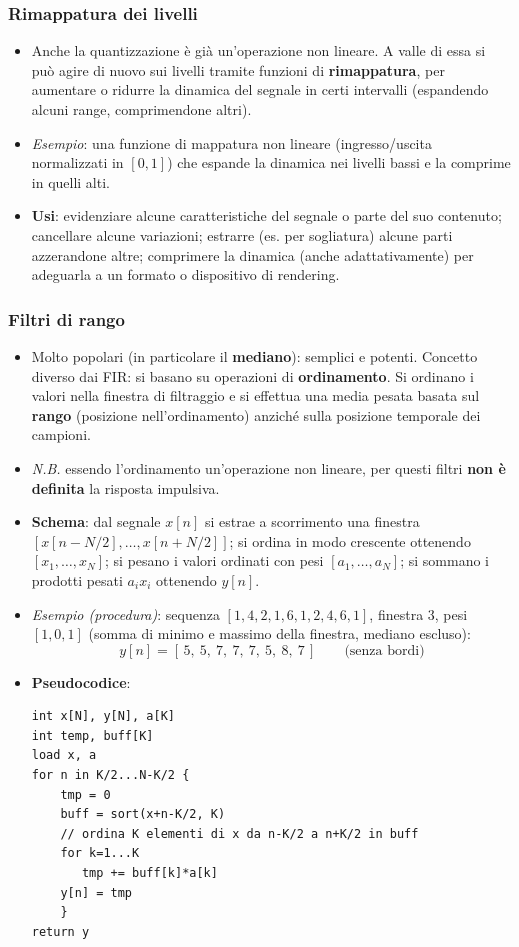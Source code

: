 \documentclass[12pt, a4paper]{article}
\begin{document}
\subsubsection{Rimappatura dei livelli}
\begin{itemize}
    \item Anche la quantizzazione è già un'operazione non lineare. A valle di essa si può agire di nuovo sui livelli tramite funzioni di \textbf{rimappatura}, per aumentare o ridurre la dinamica del segnale in certi intervalli (espandendo alcuni range, comprimendone altri).
    \item \textit{Esempio}: una funzione di mappatura non lineare (ingresso/uscita normalizzati in $[0,1]$) che espande la dinamica nei livelli bassi e la comprime in quelli alti.
    \item \textbf{Usi}: evidenziare alcune caratteristiche del segnale o parte del suo contenuto; cancellare alcune variazioni; estrarre (es. per sogliatura) alcune parti azzerandone altre; comprimere la dinamica (anche adattativamente) per adeguarla a un formato o dispositivo di rendering.
\end{itemize}

\subsubsection{Filtri di rango}
\begin{itemize}
    \item Molto popolari (in particolare il \textbf{mediano}): semplici e potenti. Concetto diverso dai FIR: si basano su operazioni di \textbf{ordinamento}. Si ordinano i valori nella finestra di filtraggio e si effettua una media pesata basata sul \textbf{rango} (posizione nell'ordinamento) anziché sulla posizione temporale dei campioni.
    \item[] \textit{N.B.} essendo l'ordinamento un'operazione non lineare, per questi filtri \textbf{non è definita} la risposta impulsiva.
    \item \textbf{Schema}: dal segnale $x[n]$ si estrae a scorrimento una finestra $[x[n-N/2],\dots,x[n+N/2]]$; si ordina in modo crescente ottenendo $[x_1,\dots,x_N]$; si pesano i valori ordinati con pesi $[a_1,\dots,a_N]$; si sommano i prodotti pesati $a_ix_i$ ottenendo $y[n]$.
    \item \textit{Esempio (procedura)}: sequenza $[1,4,2,1,6,1,2,4,6,1]$, finestra $3$, pesi $[1,0,1]$ (somma di minimo e massimo della finestra, mediano escluso):
    $$y[n] = [\,5,\ 5,\ 7,\ 7,\ 7,\ 5,\ 8,\ 7\,] \qquad \text{(senza bordi)}$$
    \item \textbf{Pseudocodice}:
    \begin{verbatim}
int x[N], y[N], a[K]
int temp, buff[K]
load x, a
for n in K/2...N-K/2 {
    tmp = 0
    buff = sort(x+n-K/2, K)
    // ordina K elementi di x da n-K/2 a n+K/2 in buff
    for k=1...K
       tmp += buff[k]*a[k]
    y[n] = tmp
    }
return y
    \end{verbatim}
\end{itemize}
\end{document}
